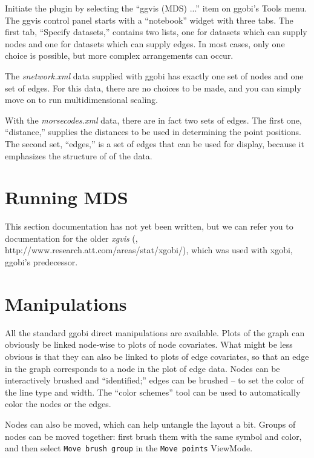 \documentclass[11pt]{article}
\begin{document}
Initiate the plugin by selecting the ``ggvis (MDS) ...'' item on ggobi's
Tools menu.  The ggvis control panel starts with a ``notebook''
widget with three tabs.  The first tab, ``Specify datasets,'' contains
two lists, one for datasets which can supply nodes and one for datasets
which can supply edges.  In most cases, only one choice is possible,
but more complex arrangements can occur.

The {\em snetwork.xml} data supplied with ggobi has exactly one set of
nodes and one set of edges.  For this data, there are no choices to be
made, and you can simply move on to run multidimensional scaling.

With the {\em morsecodes.xml} data, there are in fact two sets of edges.
The first one, ``distance,'' supplies the distances to be used in
determining the point positions.  The second set, ``edges,'' is a set of edges
that can be used for display, because it emphasizes the structure of
of the data.

\section{Running MDS}

This section documentation has not yet been written, but we can
refer you to documentation for the older {\em xgvis}
(\cite{xgvis_jcgs2002}, http://www.research.att.com/areas/stat/xgobi/), which
was used with xgobi, ggobi's predecessor.

\section{Manipulations}

All the standard ggobi direct manipulations are available.  Plots of
the graph can obviously be linked node-wise to plots of node covariates.
What might be less obvious is that they can also be linked to plots of
edge covariates, so that an edge in the graph corresponds to a node in the
plot of edge data.  Nodes can be interactively brushed and ``identified;''
edges can be brushed -- to set the color of the line type and width.
The ``color schemes'' tool can be used to automatically color the nodes
or the edges.

Nodes can also be moved, which can help untangle the layout a bit.
Groups of nodes can be moved together: first brush them with
the same symbol and color, and then select {\tt Move brush group}
in the {\tt Move points} ViewMode.

\end{document}
